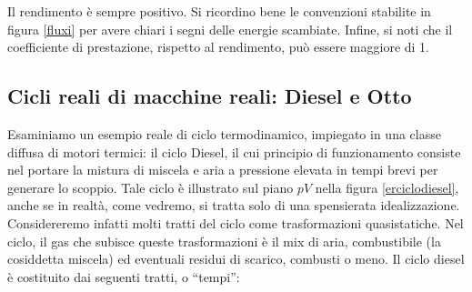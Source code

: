 \noindent Il rendimento è sempre positivo.
Si ricordino bene le convenzioni stabilite in figura
\ref{fluxi} per avere chiari i segni delle energie scambiate.
Infine, si noti che il coefficiente di prestazione, rispetto al
rendimento, può essere maggiore di 1.

\subsection[Cicli Diesel e Otto]{Cicli reali di macchine reali: Diesel e Otto}
Esaminiamo un esempio reale di ciclo termodinamico, impiegato in
una classe diffusa di motori termici: il ciclo Diesel, il cui
principio di funzionamento consiste nel portare la mistura di
miscela e aria a pressione elevata in tempi brevi per generare
lo scoppio. Tale ciclo
è illustrato sul piano $pV$ nella figura \ref{erciclodiesel}, anche
se in realtà, come vedremo, si tratta solo di una spensierata idealizzazione.
Considereremo infatti molti tratti del ciclo come trasformazioni
quasistatiche. Nel ciclo, il gas che subisce queste trasformazioni
è il mix di aria, combustibile (la cosiddetta miscela) ed
eventuali residui di scarico, combusti o meno.
Il ciclo diesel è costituito dai seguenti tratti, o
``tempi'':

